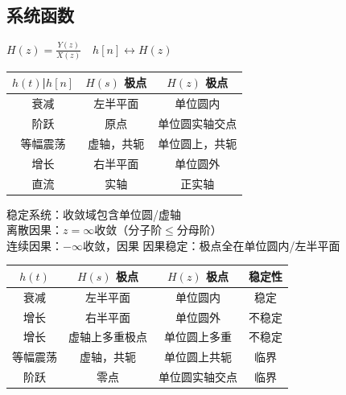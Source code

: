 \subsection{系统函数}
\vspace{2pt}
\(H(z)=\frac{Y(z)}{X(z)}\quad h[n]\leftrightarrow H(z)\)

\vspace{-10pt}
\begin{table}[H]
    \tiny
    \setlength{\parskip}{0pt plus 0.5ex}
    \begin{tabular}{@{}ccc@{}}
    \toprule
    $h(t)$|$h[n]$ & $H(s)$ 极点 & $H(z)$ 极点 \\ \midrule
    衰减              & 左半平面        & 单位圆内        \\
    阶跃              & 原点          & 单位圆实轴交点    \\
    等幅震荡            & 虚轴，共轭       & 单位圆上，共轭     \\
    增长              & 右半平面        & 单位圆外        \\
    直流              & 实轴          & 正实轴         \\ \bottomrule
    \end{tabular}
\end{table}
\vspace{-10pt}

稳定系统：收敛域包含单位圆/虚轴\\
离散因果：\(z=\infty\)收敛（分子阶\(\leq\)分母阶）\\
连续因果：\(-\infty\)收敛，因果
因果稳定：极点全在单位圆内/左半平面

\vspace{-10pt}
\begin{table}[H]
    \tiny
    \setlength{\parskip}{0pt plus 0.5ex}
    \begin{tabular}{@{}cccc@{}}
    \toprule
    $h(t)$ & $H(s)$ 极点 & $H(z)$ 极点 & 稳定性 \\ \midrule
    衰减              & 左半平面        & 单位圆内        & 稳定  \\
    增长              & 右半平面        & 单位圆外        & 不稳定 \\
    增长              & 虚轴上多重极点     & 单位圆上多重    & 不稳定 \\
    等幅震荡            & 虚轴，共轭       & 单位圆上共轭     & 临界  \\
    阶跃              & 零点          & 单位圆实轴交点    & 临界  \\ \bottomrule
    \end{tabular}
\end{table}
\vspace{-10pt}


